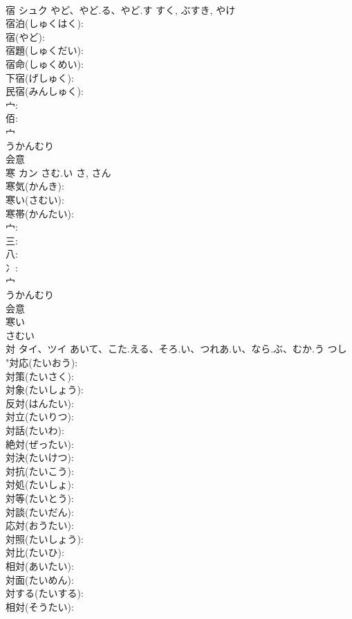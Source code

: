 \documentclass[8pt]{extreport}
\begin{document}
\begin{CJK}{UTF8}{min}
\\	宿	シュク	やど、やど.る、やど.す	すく, ぶすき, やけ	
\\	宿泊(しゅくはく): 
\\	宿(やど): 
\\	宿題(しゅくだい): 
\\	宿命(しゅくめい): 
\\	下宿(げしゅく): 
\\	民宿(みんしゅく): 
\\	宀: 
\\	佰: 
\\	宀	
\\	うかんむり	
\\	会意 
\\	寒	カン	さむ.い	さ, さん	
\\	寒気(かんき): 
\\	寒い(さむい): 
\\	寒帯(かんたい): 
\\	宀: 
\\	三: 
\\	八: 
\\	冫: 
\\	宀	
\\	うかんむり	
\\	会意 
\\	寒い　
\\	さむい　
\\	対	タイ、ツイ	あいて、こた.える、そろ.い、つれあ.い、なら.ぶ、むか.う	つし	
\\	"対応(たいおう): 
\\	対策(たいさく): 
\\	対象(たいしょう): 
\\	反対(はんたい): 
\\	対立(たいりつ): 
\\	対話(たいわ): 
\\	絶対(ぜったい): 
\\	対決(たいけつ): 
\\	対抗(たいこう): 
\\	対処(たいしょ): 
\\	対等(たいとう): 
\\	対談(たいだん): 
\\	応対(おうたい): 
\\	対照(たいしょう): 
\\	対比(たいひ): 
\\	相対(あいたい): 
\\	対面(たいめん): 
\\	対する(たいする): 
\\	相対(そうたい): 

\end{CJK}
\end{document}

